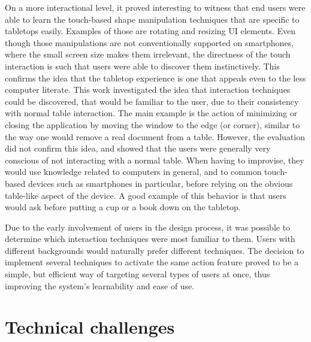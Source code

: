 On a more interactional level, it proved interesting to witness that end users were able to learn the touch-based shape manipulation techniques that are specific to tabletops easily.
Examples of those are rotating and resizing UI elements.
Even though those manipulations are not conventionally supported on smartphones, where the small screen size makes them irrelevant, the directness of the touch interaction is such that users were able to discover them instinctively.
This confirms the idea that the tabletop experience is one that appeals even to the less computer literate.
This work investigated the idea that interaction techniques could be discovered, that would be familiar to the user, due to their consistency with normal table interaction.
The main example is the action of minimizing or closing the application by moving the window to the edge (or corner), similar to the way one would remove a real document from a table.
However, the evaluation did not confirm this idea, and showed that the users were generally very conscious of not interacting with a normal table.
When having to improvise, they would use knowledge related to computers in general, and to common touch-based devices such as smartphones in particular, before relying on the obvious table-like aspect of the device.
A good example of this behavior is that users would ask before putting a cup or a book down on the tabletop.



Due to the early involvement of users in the design process, it was possible to determine which interaction techniques were most familiar to them.
Users with different backgrounds would naturally prefer different techniques.
The decision to implement several techniques to activate the same action feature proved to be a simple, but efficient way of targeting several types of users at once, thus improving the system's learnability and ease of use.

\section{Technical challenges}
\label{disc:technical}

